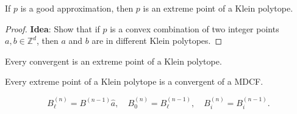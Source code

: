 \begin{lemma}
  If $p$ is a good approximation, then $p$ is an extreme point of a Klein polytope.
\end{lemma}

\begin{proof}
  \textbf{Idea}: Show that if $p$ is a convex combination of two integer points $a, b ∈ ℤ^d$,
  then $a$ and $b$ are in different Klein polytopes.
\end{proof}

\begin{theorem}
  Every convergent is an extreme point of a Klein polytope.
\end{theorem}

\begin{theorem}
  Every extreme point of a Klein polytope is a convergent of a MDCF.
\end{theorem}

\[
  B_ℓ^{(n)} = B^{(n-1)} \hat a, \quad
  B_0^{(n)} = B_ℓ^{(n-1)}, \quad
  B_i^{(n)} = B_i^{(n-1)}.
\]
